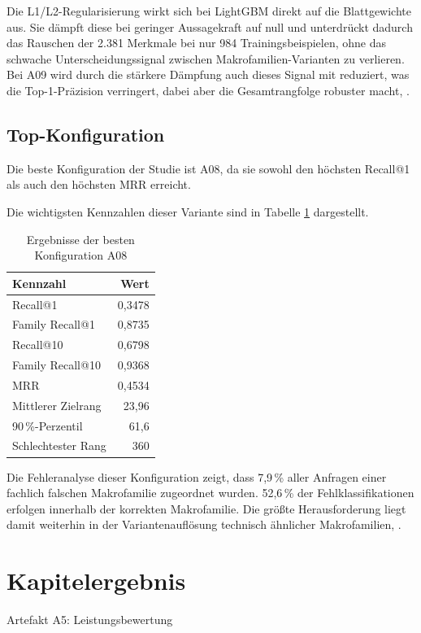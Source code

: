 Die L1/L2-Regularisierung wirkt sich bei LightGBM direkt auf die Blattgewichte aus.
Sie dämpft diese bei geringer Aussagekraft auf null und unterdrückt dadurch das Rauschen der 2.381 Merkmale bei nur 984 Trainingsbeispielen, ohne das schwache Unterscheidungssignal zwischen Makrofamilien-Varianten zu verlieren.
Bei A09 wird durch die stärkere Dämpfung auch dieses Signal mit reduziert, was die Top-1-Präzision verringert, dabei aber die Gesamtrangfolge robuster macht, \parencite{LTR_Configuration_Test_Series}.

\subsection{Top-Konfiguration}

Die beste Konfiguration der Studie ist A08, da sie sowohl den höchsten Recall@1 als auch den höchsten MRR erreicht\parencite{LTR_Configuration_Test_Series}.

Die wichtigsten Kennzahlen dieser Variante sind in Tabelle \ref{tab:a08_best} dargestellt. 

\begin{table}[H] 
    \centering 
    \caption{Ergebnisse der besten Konfiguration A08} 
    \label{tab:a08_best} 
    \begin{tabular}{lr} 
        \toprule 
        \textbf{Kennzahl} & \textbf{Wert} \\ 
        \midrule Recall@1 & 0,3478 \\ 
        Family Recall@1 & 0,8735 \\ 
        Recall@10 & 0,6798 \\ 
        Family Recall@10 & 0,9368 \\
        MRR & 0,4534 \\ 
        Mittlerer Zielrang & 23,96 \\ 
        90\,\%-Perzentil & 61,6 \\ 
        Schlechtester Rang & 360 \\ 
        \bottomrule 
    \end{tabular} 
\end{table}

Die Fehleranalyse dieser Konfiguration zeigt, dass 7,9\,\% aller Anfragen einer fachlich falschen Makrofamilie zugeordnet wurden.
52,6\,\% der Fehlklassifikationen erfolgen innerhalb der korrekten Makrofamilie. 
Die größte Herausforderung liegt damit weiterhin in der Variantenauflösung technisch ähnlicher Makrofamilien, \parencite{LTR_Configuration_Test_Series}.




\section{Kapitelergebnis}

Artefakt A5:
Leistungsbewertung
